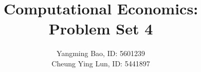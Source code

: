 \documentclass[11pt]{article}
\title{Computational Economics: Problem Set 4}
\date{}
\author{Yangming Bao, ID: 5601239\\Cheung Ying Lun, ID: 5441897}
\begin{document}
\maketitle






\pagebreak
\appendix

\end{document}

